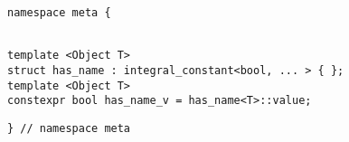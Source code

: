 
\begin{verbatim}
namespace meta {
\end{verbatim}
\begin{verbatim}

template <Object T>
struct has_name : integral_constant<bool, ... > { };
template <Object T>
constexpr bool has_name_v = has_name<T>::value;

\end{verbatim}
\begin{verbatim}
} // namespace meta
\end{verbatim}
